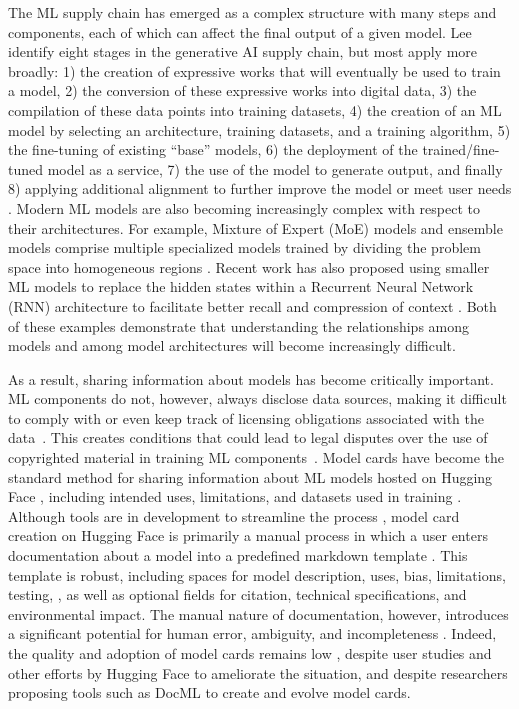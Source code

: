 
The ML supply chain has emerged as a complex structure with many steps and components, each of which can affect the final output of a given model. Lee \etal identify eight stages in the generative AI supply chain, but most apply more broadly: 1) the creation of expressive works that will eventually be used to train a model, 2) the conversion of these expressive works into digital data, 3) the compilation of these data points into training datasets, 4) the creation of an ML model by selecting an architecture, training datasets, and a training algorithm, 5) the fine-tuning of existing ``base'' models, 6) the deployment of the trained/fine-tuned model as a service, 7) the use of the model to generate output, and finally 8) applying additional alignment to further improve the model or meet user needs \cite{lee2023talkin}. %
Modern ML models are also becoming increasingly complex with respect to their architectures.  For example, Mixture of Expert (MoE) models and ensemble models comprise multiple specialized models trained by dividing the problem space into homogeneous regions \cite{masoudnia2014mixture, mixtral}.  Recent work has also proposed using smaller ML models to replace the hidden states within a Recurrent Neural Network (RNN) architecture to facilitate better recall and compression of context \cite{sun2024learning}.  Both of these examples demonstrate that understanding the relationships among models and among model architectures will become increasingly difficult.

As a result, sharing information about models 
has become critically important. ML components do not, however, always disclose data sources, making it difficult to comply with or even keep track of licensing obligations associated with the data~\cite{hassan2024rethinking}.  This creates conditions that could lead to legal disputes over the use of copyrighted material in training ML components~\cite{ai_copyright}. Model cards \cite{mitchell2019model}
have become the standard method for sharing information 
about ML models hosted on Hugging Face \cite{what_are_model_cards}, including intended uses, limitations, and datasets used in training 
\cite{model_card_guidebook}. Although tools are in development to streamline the process \cite{model_card_creation_tool}, model card creation on Hugging Face is primarily a manual process in which a user enters documentation about a model into a predefined markdown template \cite{model_card_template}. This template is robust, including spaces for model description, uses, bias, limitations, testing, \etc, as well as optional fields for citation, technical specifications, and environmental impact.   %
The manual nature of documentation, however, introduces a significant potential for human error, ambiguity, and incompleteness \cite{jiang2024peatmoss, jiang2023ptmtorrent}. Indeed, the quality and adoption of model cards remains low \cite{bhat2023aspirations}, despite user studies and other efforts by Hugging Face \cite{model_card_user_studies} to ameliorate the situation, and despite researchers proposing tools such as DocML \cite{bhat2023aspirations} to create and evolve model cards.



